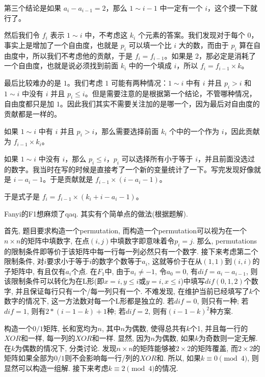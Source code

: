 第三个结论是如果 $a_i-a_{i-1}=2$，那么 $1\sim i-1$ 中一定有一个 $i$，这个摸一下就行了。

然后我们令 $f_i$ 表示 $1\sim i$ 中，不考虑这 $k_i$ 个元素的答案。我们发现对于每个 $0$，事实上是增加了一个自由度，也就是 $p_i$ 可以填一个比 $i$ 大的数，而由于 $p_i$ 算在自由度中，所以我们不考虑他的贡献，于是 $f_i=f_{i-1}$。如果是 $2$，那必定是消耗了一个自由度，也就是说必须找到前面 $k_i$ 中的一个填成 $i$，所以 $f_i=f_{i-1}\times k$。

最后比较难办的是 $1$。我们考虑 $1$ 可能有两种情况：$1\sim i$ 中有 $i$ 并且 $p_i>i$ 和 $1\sim i$ 中没有 $i$ 并且 $p_i\le i$。但是需要注意的是根据第一个结论，不管哪种情况，自由度都只是加 $1$。因此我们其实不需要关注加的是哪一个，因为最后对自由度的贡献都是一样的。

如果 $1\sim i$ 中有 $i$ 并且 $p_i>i$，那么需要选择前面 $k_i$ 个中的一个作为 $i$，因此贡献为 $f_{i-1}\times k_i$。

如果 $1\sim i$ 中没有 $i$，那么 $p_i\le i$，$p_i$ 可以选择所有小于等于 $i$，并且前面没选过的数字。我当时在写的时候是直接考了一个新的变量统计了一下。写完发现好像就是 $i-a_i-1$。于是贡献就是 $f_{i-1}\times (i - a_i - 1)$。

于是式子是 $f_i=f_{i-1}\times (k_i+i-a_i-1)$。

\sol Fanyi的F1想麻烦了qaq. 其实有个简单点的做法(根据题解). 

首先, 题目要求构造一个permutation, 而构造一个permutation可以视为在一个$n \times n$的矩阵中填数字, 在点$(i,j)$中填数字即意味着令$p_i = j$. 那么, permutations的限制条件即等价于该矩阵中每一行每一列必然只有一个数字. 接下来考虑第二个限制条件, 对$i$要求小于等于$i$的数字个数等于$a_i$, 这就等价于在从$(1,1)$到$(i,i)$的子矩阵中, 有且仅有$a_i$个点. 在$F_1$中, 由于$a_i \not = -1$, 令$a_0 = 0$, 有$dif = a_i - a_{i-1}$, 则该限制条件可以转化为在L形(即$x = i, y \leq i$或$y = i, x \leq i$)中填写$dif(0,1,2)$个数字, 并且保证每行只有一个/每一列只有一个. 不难发现, 在维护当前已经填写了$k$个数字的情况下, 这一方法数对每一个L形都是独立的. 若$dif = 0$, 则只有一种; 若$dif = 1$, 则有$2 * (i - 1 - k) + 1$种; 若$dif = 2$, 则有$(i - 1 - k)^2$种方案.

\prob 构造一个$0/1$矩阵, 长和宽均为$n$, 其中$n$为偶数, 使得总共有$k$个1, 并且每一行的$XOR$和一样, 每一列的$XOR$和一样.
\sol 显然, 因为$n$为偶数, 如果$k$为奇数则一定无解. 在$k$为偶数的情况下, 分类讨论. 发现$n\times n$的矩阵能够被$2 \times 2$的矩阵覆盖, 而$2 \times 2$的矩阵如果全部为$0/1$则不会影响每一行/列的$XOR$和. 所以, 如果$k \equiv 0 \pmod{4}$, 则显然可以构造一组解. 接下来考虑$k \equiv 2 \pmod{4}$的情况.

